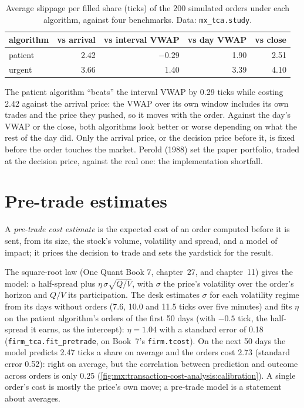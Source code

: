 \begin{table}[ht]
\centering
\small
\begin{tabular}{@{}lrrrr@{}}
\toprule
algorithm & vs arrival & vs interval VWAP & vs day VWAP & vs close \\
\midrule
patient & 2.42 & $-0.29$ & 1.90 & 2.51 \\
urgent & 3.66 & 1.40 & 3.39 & 4.10 \\
\bottomrule
\end{tabular}
\caption{Average slippage per filled share (ticks) of the 200 simulated orders under each algorithm, against four benchmarks. Data:
\texttt{mx\_tca.study}.}\label{tab:mx:transaction-cost-analysis:benchmarks}
\end{table}

The patient algorithm ``beats'' the interval VWAP by 0.29 ticks while costing 2.42 against the arrival price: the VWAP over its own window includes its
own trades and the price they pushed, so it moves with the order. Against the day's VWAP or the close, both algorithms look better or worse depending
on what the rest of the day did. Only the arrival price, or the decision price before it, is fixed before the order touches the market. Perold (1988)
set the paper portfolio, traded at the decision price, against the real one: the implementation shortfall.

\section{Pre-trade estimates}

\begin{definition}\label{def:mx:transaction-cost-analysis:pretrade}
A \emph{pre-trade cost estimate} is the expected cost of an order computed before it is sent, from its size, the
stock's volume, volatility and spread, and a model of impact; it prices the decision to trade and sets the yardstick for the result.
\end{definition}

The square-root law (One Quant Book 7, chapter~27, and chapter~11) gives the model: a half-spread plus $\eta\,\sigma\sqrt{Q/V}$, with $\sigma$ the price's
volatility over the order's horizon and $Q/V$ its participation. The desk estimates $\sigma$ for each volatility regime from its days without orders
(7.6, 10.0 and 11.5 ticks over five minutes) and fits $\eta$ on the patient algorithm's orders of the first 50 days (with $-0.5$ tick, the half-spread
it earns, as the intercept): $\eta=1.04$ with a standard error of 0.18 (\texttt{firm\_tca.fit\_pretrade}, on Book~7's \texttt{firm.tcost}). On the
next 50 days the model predicts 2.47 ticks a share on average and the orders cost 2.73 (standard error 0.52): right on average, but the correlation
between prediction and outcome across orders is only 0.25 (\cref{fig:mx:transaction-cost-analysis:calibration}). A single order's cost is mostly the
price's own move; a pre-trade model is a statement about averages.

